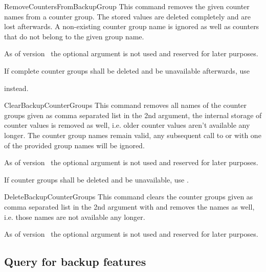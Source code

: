 \documentclass[12pt,a4paper,oneside]{article}
\makeatletter
\newcommand{\chdocextractversion}[1]{%
  \@nameuse{#1}%
}
\newcommand{\CHDocNew}[1]{%
  \tcbdocmarginnote[doclang/new={N},
  colframe=blue,
  halign=left,
  colback={blue!20!white},
  fontupper={\tiny}
  ]{%
    \chdocextractversion{xassoccntversion#1}%
  }%
}
\def\packageversion{\xassoccntpackageversion}%
\makeatother
\begin{document}
\begin{docCommand}[before={\CHDocNew{1.0}}]{RemoveCountersFromBackupGroup}{}
  This command removes the given counter names from a counter group. The stored values are deleted completely and are lost afterwards. A non-existing counter group name is ignored as well as counters that do not belong to the given group name. 

  As of version \packageversion\ the optional argument is not used and reserved for later purposes. 

  If complete counter groups shall be deleted and be unavailable afterwards, use 

 instead. 
\end{docCommand}


\begin{docCommand}[before={\CHDocNew{1.0}}]{ClearBackupCounterGroups}{}
  This command removes all names of the counter groups given as comma separated list in the 2nd argument, the internal storage of counter values is removed as well, i.e. older counter values aren't available any longer. The counter group names remain valid, any subsequent call to  or  with one of the provided group names will be ignored. 
  
  As of version \packageversion\ the optional argument is not used and reserved for later purposes. 

  If counter groups shall be deleted and be unavailable, use . 
\end{docCommand}


\begin{docCommand}[before={\CHDocNew{1.0}}]{DeleteBackupCounterGroups}{}
  This command clears the counter groups given as comma separated list in the 2nd argument with  and removes the names as well, i.e. those names are not available any longer.
 
  As of version \packageversion\ the optional argument is not used and reserved for later purposes. 
\end{docCommand}


\subsection{Query for backup features}\label{subsec::querybackupmacros}\CHDocNew{1.0}
\end{document}
